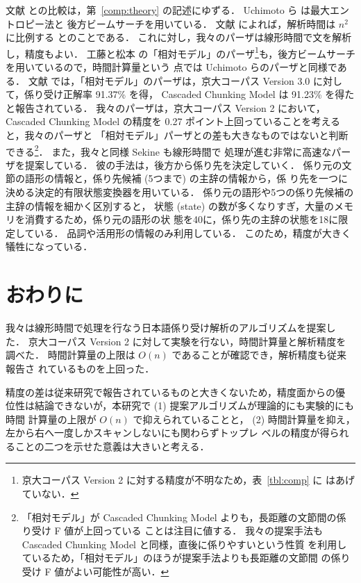 \documentclass[japanese]{jnlp_1.2c}
\begin{document}
文献 \cite{Kudo2002} との比較は，第~\ref{comp:theory} 
の記述にゆずる．
Uchimoto ら  は最大エントロピー法と
後方ビームサーチを用いている．
文献 \cite{Sekine2000Backward} によれば，解析時間は $n^{2}$ に比例する
とのことである．
これに対し，我々のパーザは線形時間で文を解析し，精度もよい．
工藤と松本 \cite{Kudo2005} の「相対モデル」のパーザ\footnote{
京大コーパス Version 2 に対する精度が不明なため，表~\ref{tbl:comp} に
はあげていない．}も，後方ビームサーチを用いているので，時間計算量という
点では Uchimoto らのパーザと同様である．
文献 \cite{Kudo2005} では，「相対モデル」のパーザは，京大コーパス 
Version 3.0 に対して，係り受け正解率 91.37\% を得，
Cascaded Chunking Model は 91.23\% を得たと報告されている．
我々のパーザは，京大コーパス Version 2 において，Cascaded Chunking
Model の精度を 0.27 ポイント上回っていることを考えると，我々のパーザと
「相対モデル」パーザとの差も大きなものではないと判断できる\footnote{
「相対モデル」が Cascaded Chunking Model よりも，長距離の文節間の係
り受け F 値が上回っている \cite{Kudo2005} ことは注目に値する．
我々の提案手法も Cascaded Chunking Model と同様，直後に係りやすいという性質
を利用しているため，「相対モデル」のほうが提案手法よりも長距離の文節間
の係り受け F 値がよい可能性が高い．
}．
また，我々と同様 Sekine  も線形時間で
処理が進む非常に高速なパーザを提案している．
彼の手法は，後方から係り先を決定していく．
係り元の文節の語形の情報と，係り先候補 (5つまで) の主辞の情報から，係
り先を一つに決める決定的有限状態変換器を用いている．
係り元の語形や5つの係り先候補の主辞の情報を細かく区別すると，
状態 (state) の数が多くなりすぎ，大量のメモリを消費するため，係り元の語形の状
態を40に，係り先の主辞の状態を18に限定している．
品詞や活用形の情報のみ利用している．
このため，精度が大きく犠牲になっている．

\section{おわりに}
我々は線形時間で処理を行なう日本語係り受け解析のアルゴリズムを提案し
た．
京大コーパス Version 2 に対して実験を行ない，時間計算量と解析精度を調べた．
時間計算量の上限は $O(n)$ であることが確認でき，解析精度も従来報告さ
れているものを上回った．

精度の差は従来研究で報告されているものと大きくないため，精度面からの優
位性は結論できないが，本研究で (1) 提案アルゴリズムが理論的にも実験的にも時間
計算量の上限が $O(n)$ で抑えられていることと，
(2) 時間計算量を抑え，左から右へ一度しかスキャンしないにも関わらずトップレ
ベルの精度が得られることの二つを示せた意義は大きいと考える．
\end{document}
